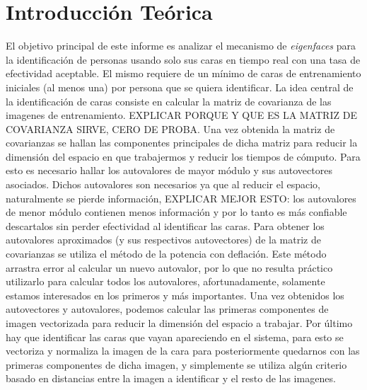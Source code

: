 \section{Introducción Teórica}
%
El objetivo principal de este informe es analizar el mecanismo de \emph{eigenfaces} para la identificación de personas 
usando solo sus caras en tiempo real con una tasa de efectividad aceptable. El mismo requiere de un mínimo de caras de 
entrenamiento iniciales (al menos una) por persona que se quiera identificar.
La idea central de la identificación de caras consiste en calcular la matriz de covarianza de las imagenes de entrenamiento. 
EXPLICAR PORQUE Y QUE ES LA MATRIZ DE COVARIANZA SIRVE, CERO DE PROBA. Una vez obtenida la matriz de covarianzas se hallan
las componentes principales de dicha matriz para reducir la dimensión del espacio en que trabajermos y reducir los tiempos 
de cómputo. Para esto es necesario hallar los autovalores de mayor módulo y sus autovectores asociados. Dichos autovalores 
son necesarios ya que al reducir el espacio, naturalmente se pierde información, EXPLICAR MEJOR ESTO: los autovalores de 
menor módulo contienen menos información y por lo tanto es más confiable descartalos sin perder efectividad al identificar 
las caras. Para obtener los autovalores aproximados (y sus respectivos autovectores) de la matriz de covarianzas se utiliza 
el método de la potencia con deflación. Este método arrastra error al calcular un nuevo autovalor, por lo que 
no resulta práctico utilizarlo para calcular todos los autovalores, afortunadamente, solamente estamos interesados en 
los primeros y más importantes.
Una vez obtenidos los autovectores y autovalores, podemos calcular las primeras componentes de imagen vectorizada para 
reducir la dimensión del espacio a trabajar.
Por último hay que identificar las caras que vayan apareciendo en el sistema, para esto se vectoriza y normaliza la 
imagen de la cara para posteriormente quedarnos con las primeras componentes de dicha imagen, y simplemente se utiliza 
algún criterio basado en  distancias entre la imagen a identificar y el resto de las imagenes.

